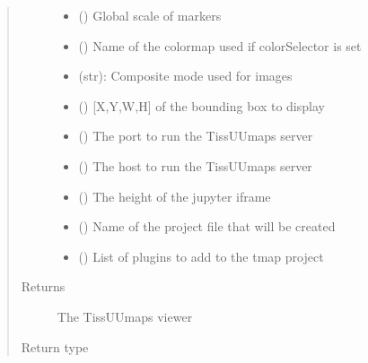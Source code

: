 \documentclass[letterpaper,10pt,english,openany,oneside]{sphinxmanual}
\begin{document}
\begin{fulllineitems}
\begin{quote}
\begin{description}
\begin{itemize}
\item {} 
\sphinxAtStartPar
{} () \textendash{} Global scale of markers

\item {} 
\sphinxAtStartPar
{} () \textendash{} Name of the colormap used if colorSelector is set

\item {} 
\sphinxAtStartPar
{} \textendash{} (str): Composite mode used for images

\item {} 
\sphinxAtStartPar
{} () \textendash{} {[}X,Y,W,H{]} of the bounding box to display

\item {} 
\sphinxAtStartPar
{} () \textendash{} The port to run the TissUUmaps server

\item {} 
\sphinxAtStartPar
{} () \textendash{} The host to run the TissUUmaps server

\item {} 
\sphinxAtStartPar
{} () \textendash{} The height of the jupyter iframe

\item {} 
\sphinxAtStartPar
{} () \textendash{} Name of the project file that will be created

\item {} 
\sphinxAtStartPar
{} () \textendash{} List of plugins to add to the tmap project

\end{itemize}

\item[{Returns}] \leavevmode
\sphinxAtStartPar
The TissUUmaps viewer

\item[{Return type}] \leavevmode
\sphinxAtStartPar
{\hyperref[\detokenize{docs/advanced/jupyter:tissuumaps.jupyter.TissUUmapsViewer}]{}}

\end{description}\end{quote}

\end{fulllineitems}
\end{document}
